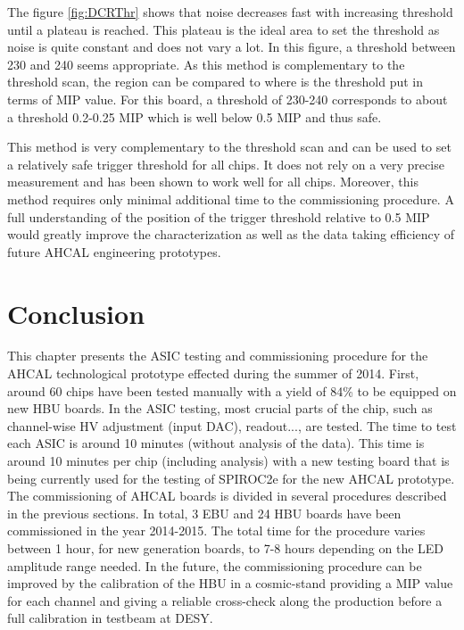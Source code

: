 The figure \ref{fig:DCRThr} shows that noise decreases fast with increasing threshold until a plateau is reached. This plateau is the ideal area to set the threshold as noise is quite constant and does not vary a lot. In this figure, a threshold between 230 and 240 seems appropriate. As this method is complementary to the threshold scan, the region can be compared to where is the threshold put in terms of MIP value. For this board, a threshold of 230-240 corresponds to about a threshold 0.2-0.25 MIP which is well below 0.5 MIP and thus safe.

This method is very complementary to the threshold scan and can be used to set a relatively safe trigger threshold for all chips. It does not rely on a very precise measurement and has been shown to work well for all chips. Moreover, this method requires only minimal additional time to the commissioning procedure. A full understanding of the position of the trigger threshold relative to 0.5 MIP would greatly improve the characterization as well as the data taking efficiency of future AHCAL engineering prototypes.

\section{Conclusion}

This chapter presents the ASIC testing and commissioning procedure for the AHCAL technological prototype effected during the summer of 2014. First, around 60 chips have been tested manually with a yield of 84\% to be equipped on new HBU boards. In the ASIC testing, most crucial parts of the chip, such as channel-wise HV adjustment (input DAC), readout..., are tested. The time to test each ASIC is around 10 minutes (without analysis of the data). This time is around 10 minutes per chip (including analysis) with a new testing board that is being currently used for the testing of SPIROC2e for the new AHCAL prototype.
The commissioning of AHCAL boards is divided in several procedures described in the previous sections. In total, 3 EBU and 24 HBU boards have been commissioned in the year 2014-2015. The total time for the procedure varies between 1 hour, for new generation boards, to 7-8 hours depending on the LED amplitude range needed. In the future, the commissioning procedure can be improved by the calibration of the HBU in a cosmic-stand providing a MIP value for each channel and giving a reliable cross-check along the production before a full calibration in testbeam at DESY.
